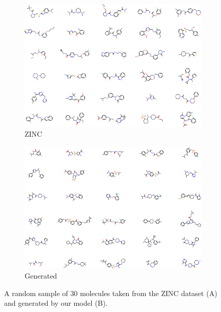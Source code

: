 \begin{figure}[h!]
    \centering
    \begin{subfigure}[b]{0.49\textwidth}
        \centering
        \includegraphics[width=.9\textwidth]{Figures/Chapter7/samples.eps}
        \caption{ZINC}
        \label{fig:zinc-samples}
    \end{subfigure}
    \hfill
    \begin{subfigure}[b]{0.49\textwidth}
        \centering
        \includegraphics[width=.9\textwidth]{Figures/Chapter7/generated.eps}
        \caption{Generated}
        \label{fig:generated-samples}
    \end{subfigure}
       \caption{A random sample of 30 molecules taken from the ZINC dataset ({\scriptsize A}) and generated by our model ({\scriptsize B}).}
       \label{fig:mol-samples}
\end{figure}